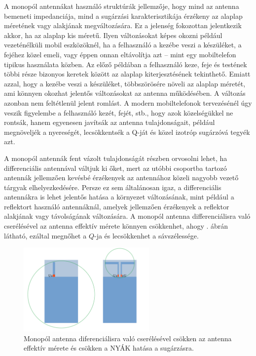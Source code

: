 \par A monopól antennákat használó struktúrák jellemzője, hogy mind az antenna bemeneti impedanciája, mind a sugárzási karakterisztikája érzékeny az alaplap méretének vagy alakjának megváltozására. Ez a jelenség fokozottan jelentkezik akkor, ha az alaplap kis méretű. Ilyen változásokat képes okozni például vezeténélküli mobil eszközöknél, ha a felhasználó a kezébe veszi a készüléket, a fejéhez közel emeli, vagy éppen onnan eltávolítja azt -- mint egy mobiltelefon tipikus használata közben. Az előző példában a felhasználó keze, feje és testének többi része bizonyos keretek között az alaplap kiterjesztésének tekinthető. Emiatt azzal, hogy a kezébe veszi a készüléket, többszörösére növeli az alaplap méretét, ami könnyen okozhat jelentős változásokat az antenna működésében. A változás azonban nem feltétlenül jelent romlást. A modern mobiltelefonok tervezésénél úgy veszik figyelembe a felhasználó kezét, fejét, stb., hogy azok közelségükkel ne rontsák, hanem egyenesen javítsák az antenna tulajdonságait, például megnöveljék a nyereségét, lecsökkentsék a Q-ját és közel izotróp sugárzóvá tegyék azt.
\par A monopól antennák fent vázolt tulajdonságát részben orvosolni lehet, ha differenciális antennával váltjuk ki őket, mert az utóbbi csoportba tartozó antennák jellemzően kevésbé érzékenyek az antennához közeli nagyobb vezető tárgyak elhelyezkedésére. Persze ez sem általánosan igaz, a differenciális antennákra is lehet jelentős hatása a környezet változásának, mint például a reflektort használó antennáknál, amelyek jellemzően érzékenyek a reflektor alakjának vagy távolságának változására. A monopól antenna differenciálisra való cserélésével az antenna effektív mérete könnyen csökkenhet, ahogy . ábrán látható, ezáltal megnőhet a $Q$-ja és lecsökkenhet a sávszélessége.
\begin{figure}[h]
	\centering
	\includegraphics[width=0.6\textwidth]{kep/se-diff.pdf}
	\caption{Monopól antenna diferenciálisra való cserélésével csökken az antenna effektív mérete és csökken a NYÁK hatása a sugárzásra.}
	\label{fig:se-diff}
\end{figure}
